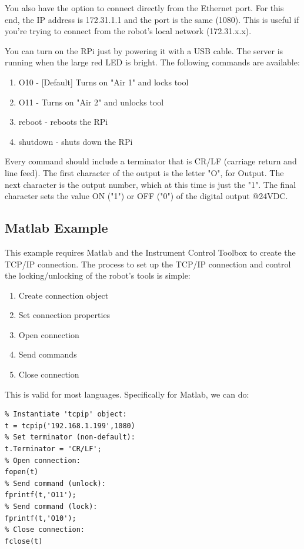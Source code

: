 \documentclass[twoside,a4paper]{refart}
\begin{document}
You also have the option to connect directly from the Ethernet port. For this end, the IP address is 172.31.1.1 and the port is the same (1080). This is useful if you're trying to connect from the robot's local network (172.31.x.x).

You can turn on the RPi just by powering it with a \mu USB cable. The server is running when the large red LED is bright. The following commands are available:
\begin{enumerate}
	\item
	O10 - [Default] Turns on "Air 1" and locks tool
	\item
	O11 - Turns on "Air 2" and unlocks tool
	\item
	reboot - reboots the RPi
	\item
	shutdown - shuts down the RPi
\end{enumerate}
Every command should include a terminator that is CR/LF (carriage return and line feed). The first character of the output is the letter "O", for Output. The next character is the output number, which at this time is just the "1". The final character sets the value ON ("1") or OFF ("0") of the digital output @24VDC. 

\subsection{Matlab Example}
This example requires Matlab and the Instrument Control Toolbox to create the TCP/IP connection.
The process to set up the TCP/IP connection and control the locking/unlocking of the robot's tools is simple:
\begin{enumerate}
	\item Create connection object
	\item Set connection properties
	\item Open connection
	\item Send commands
	\item Close connection
\end{enumerate}
This is valid for most languages. Specifically for Matlab, we can do:
\begin{verbatim}
% Instantiate 'tcpip' object:
t = tcpip('192.168.1.199',1080)
% Set terminator (non-default):
t.Terminator = 'CR/LF';
% Open connection:
fopen(t)
% Send command (unlock):
fprintf(t,'O11');
% Send command (lock):
fprintf(t,'O10');
% Close connection:
fclose(t)
\end{verbatim}
\end{document}
